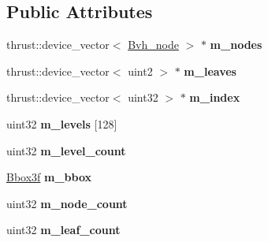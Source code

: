 \subsection*{\-Public \-Attributes}
\begin{DoxyCompactItemize}
\item 
\hypertarget{structnih_1_1cuda_1_1_binned__sah__builder_a622cb42800e5ee4b2e7d7047b2d6a450}{
thrust\-::device\-\_\-vector$<$ \hyperlink{structnih_1_1_bvh__node}{\-Bvh\-\_\-node} $>$ $\ast$ {\bfseries m\-\_\-nodes}}
\label{structnih_1_1cuda_1_1_binned__sah__builder_a622cb42800e5ee4b2e7d7047b2d6a450}

\item 
\hypertarget{structnih_1_1cuda_1_1_binned__sah__builder_ab82b4f8c71cc0a28aaf3aff2fde1b2a3}{
thrust\-::device\-\_\-vector$<$ uint2 $>$ $\ast$ {\bfseries m\-\_\-leaves}}
\label{structnih_1_1cuda_1_1_binned__sah__builder_ab82b4f8c71cc0a28aaf3aff2fde1b2a3}

\item 
\hypertarget{structnih_1_1cuda_1_1_binned__sah__builder_a4c533ca91518655498ceae8a8611dd88}{
thrust\-::device\-\_\-vector$<$ uint32 $>$ $\ast$ {\bfseries m\-\_\-index}}
\label{structnih_1_1cuda_1_1_binned__sah__builder_a4c533ca91518655498ceae8a8611dd88}

\item 
\hypertarget{structnih_1_1cuda_1_1_binned__sah__builder_ad2cba49707900fa31a015dcb432fa80d}{
uint32 {\bfseries m\-\_\-levels} \mbox{[}128\mbox{]}}
\label{structnih_1_1cuda_1_1_binned__sah__builder_ad2cba49707900fa31a015dcb432fa80d}

\item 
\hypertarget{structnih_1_1cuda_1_1_binned__sah__builder_a78d373a27961b471aa5fbdfc86b2c08f}{
uint32 {\bfseries m\-\_\-level\-\_\-count}}
\label{structnih_1_1cuda_1_1_binned__sah__builder_a78d373a27961b471aa5fbdfc86b2c08f}

\item 
\hypertarget{structnih_1_1cuda_1_1_binned__sah__builder_a7fa0f1ed12903bee53cfc6504913d5f8}{
\hyperlink{structnih_1_1_bbox}{\-Bbox3f} {\bfseries m\-\_\-bbox}}
\label{structnih_1_1cuda_1_1_binned__sah__builder_a7fa0f1ed12903bee53cfc6504913d5f8}

\item 
\hypertarget{structnih_1_1cuda_1_1_binned__sah__builder_a28681b805d3b1b4eb4875827758b82e9}{
uint32 {\bfseries m\-\_\-node\-\_\-count}}
\label{structnih_1_1cuda_1_1_binned__sah__builder_a28681b805d3b1b4eb4875827758b82e9}

\item 
\hypertarget{structnih_1_1cuda_1_1_binned__sah__builder_a5b71b3b0d4789254f8f4495b1f37c632}{
uint32 {\bfseries m\-\_\-leaf\-\_\-count}}
\label{structnih_1_1cuda_1_1_binned__sah__builder_a5b71b3b0d4789254f8f4495b1f37c632}


\end{DoxyCompactItemize}
